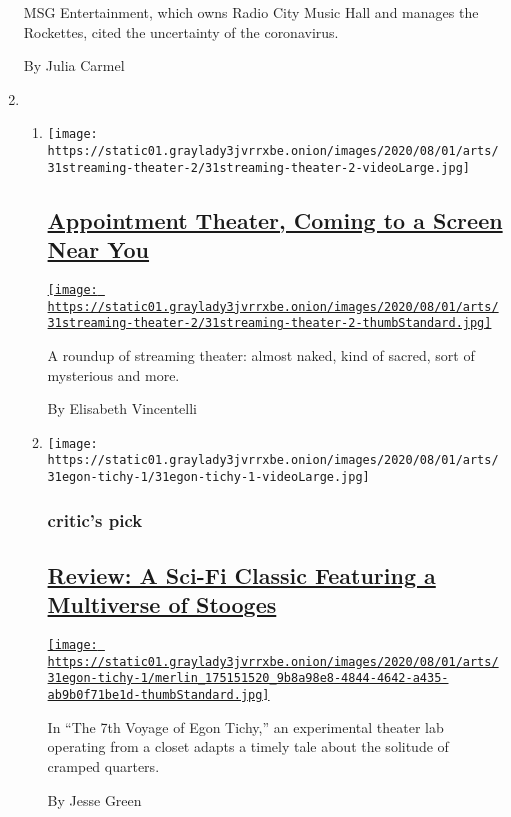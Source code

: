 \begin{enumerate}
  MSG Entertainment, which owns Radio City Music Hall and manages the
  Rockettes, cited the uncertainty of the coronavirus.

  By Julia Carmel
\item
  \begin{enumerate}
  \def\labelenumii{\arabic{enumii}.}
  \item
    \texttt{[image: https://static01.graylady3jvrrxbe.onion/images/2020/08/01/arts/31streaming-theater-2/31streaming-theater-2-videoLarge.jpg]}

    \hypertarget{appointment-theater-coming-to-a-screen-near-you}{%
    \subsection{\texorpdfstring{\href{/2020/07/30/theater/streaming-theater-online.html}{Appointment
    Theater, Coming to a Screen Near
    You}}{Appointment Theater, Coming to a Screen Near You}}\label{appointment-theater-coming-to-a-screen-near-you}}

    \href{/2020/07/30/theater/streaming-theater-online.html}{\texttt{[image: https://static01.graylady3jvrrxbe.onion/images/2020/08/01/arts/31streaming-theater-2/31streaming-theater-2-thumbStandard.jpg]}}

    A roundup of streaming theater: almost naked, kind of sacred, sort
    of mysterious and more.

    By Elisabeth Vincentelli
  \item
    \texttt{[image: https://static01.graylady3jvrrxbe.onion/images/2020/08/01/arts/31egon-tichy-1/31egon-tichy-1-videoLarge.jpg]}

    \hypertarget{critics-pick}{%
    \subsubsection{critic's pick}\label{critics-pick}}

    \hypertarget{review-a-sci-fi-classic-featuring-a-multiverse-of-stooges}{%
    \subsection{\texorpdfstring{\href{/2020/07/31/theater/the-7th-voyage-of-egon-tichy-review.html}{Review:
    A Sci-Fi Classic Featuring a Multiverse of
    Stooges}}{Review: A Sci-Fi Classic Featuring a Multiverse of Stooges}}\label{review-a-sci-fi-classic-featuring-a-multiverse-of-stooges}}

    \href{/2020/07/31/theater/the-7th-voyage-of-egon-tichy-review.html}{\texttt{[image: https://static01.graylady3jvrrxbe.onion/images/2020/08/01/arts/31egon-tichy-1/merlin\_175151520\_9b8a98e8-4844-4642-a435-ab9b0f71be1d-thumbStandard.jpg]}}

    In ``The 7th Voyage of Egon Tichy,'' an experimental theater lab
    operating from a closet adapts a timely tale about the solitude of
    cramped quarters.

    By Jesse Green
  \end{enumerate}
\end{enumerate}

